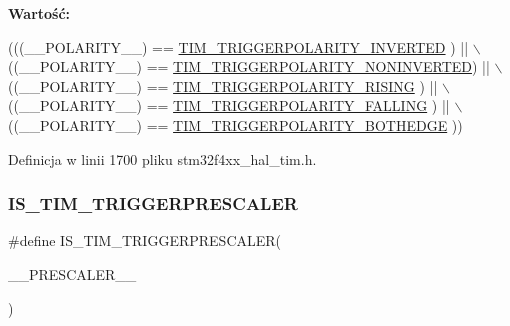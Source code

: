 {\bfseries Wartość\+:}
\begin{DoxyCode}
(((\_\_POLARITY\_\_) == \hyperlink{group___t_i_m___trigger___polarity_ga64337379c3762dca395b812c65656de4}{TIM\_TRIGGERPOLARITY\_INVERTED}   ) || \(\backslash\)
                                                ((\_\_POLARITY\_\_) == 
      \hyperlink{group___t_i_m___trigger___polarity_gad985881cdfddb63dfc52e6aaca776ff6}{TIM\_TRIGGERPOLARITY\_NONINVERTED}) || \(\backslash\)
                                                ((\_\_POLARITY\_\_) == 
      \hyperlink{group___t_i_m___trigger___polarity_ga64b521aa367d745ec00a763449634ace}{TIM\_TRIGGERPOLARITY\_RISING}     ) || \(\backslash\)
                                                ((\_\_POLARITY\_\_) == 
      \hyperlink{group___t_i_m___trigger___polarity_ga77df5988527ca829743dd57d2f867972}{TIM\_TRIGGERPOLARITY\_FALLING}    ) || \(\backslash\)
                                                ((\_\_POLARITY\_\_) == 
      \hyperlink{group___t_i_m___trigger___polarity_gaa72eb9fd278575ff05aa3dd1c173dcc8}{TIM\_TRIGGERPOLARITY\_BOTHEDGE}   ))
\end{DoxyCode}


Definicja w linii 1700 pliku stm32f4xx\+\_\+hal\+\_\+tim.\+h.

\mbox{\label{group___t_i_m___private___macros_gac38c7d0c59f17b5a6d9ff01b82ddae43}} 
\subsubsection{\texorpdfstring{I\+S\+\_\+\+T\+I\+M\+\_\+\+T\+R\+I\+G\+G\+E\+R\+P\+R\+E\+S\+C\+A\+L\+ER}{IS\_TIM\_TRIGGERPRESCALER}}
{\footnotesize\ttfamily \#define I\+S\+\_\+\+T\+I\+M\+\_\+\+T\+R\+I\+G\+G\+E\+R\+P\+R\+E\+S\+C\+A\+L\+ER(\begin{DoxyParamCaption}\item[{}]{\+\_\+\+\_\+\+P\+R\+E\+S\+C\+A\+L\+E\+R\+\_\+\+\_\+ }\end{DoxyParamCaption})}

